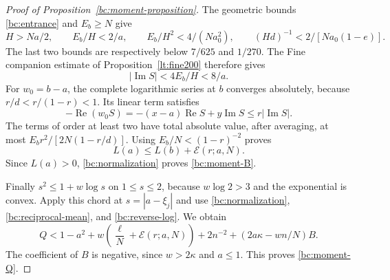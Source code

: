 \documentclass[11pt,reqno]{amsart}
\numberwithin{equation}{section}
\theoremstyle{definition}
\theoremstyle{remark}
\renewcommand{\Re}{\operatorname{Re}}
\renewcommand{\Im}{\operatorname{Im}}
\begin{document}
\begin{proof}[Proof of Proposition~\ref{bc:moment-proposition}]
The geometric bounds \eqref{bc:entrance} and $E_b\geq N$ give
\[
 H>Na/2,\qquad E_b/H<2/a,\qquad
 E_b/H^2<4/(Na_0^2),\qquad (Hd)^{-1}<2/[Na_0(1-e)].
\]
The last two bounds are respectively below $7/625$ and $1/270$.
The Fine companion estimate of Proposition~\ref{lt:fine200} therefore gives
\begin{equation}\label{bc:fine-phase}
 |\Im S|<4E_b/H<8/a.
\end{equation}
For $w_0=b-a$, the complete logarithmic series at $b$ converges
absolutely, because $r/d<r/(1-r)<1$.  Its linear term satisfies
\[
 -\Re(w_0S)=-(x-a)\Re S+y\Im S\leq r|\Im S|.
\]
The terms of order at least two have total absolute value, after
averaging, at most
$E_br^2/[2N(1-r/d)]$.  Using $E_b/N<(1-r)^{-2}$ proves
\begin{equation}\label{bc:reverse-log}
 L(a)\leq L(b)+\mathcal E(r;a,N).
\end{equation}
Since $L(a)>0$, \eqref{bc:normalization} proves
\eqref{bc:moment-B}.

Finally $s^2\leq1+w\log s$ on $1\leq s\leq2$, because
$w\log2>3$ and the exponential is convex.  Apply this chord at
$s=|a-\xi_j|$ and use
\eqref{bc:normalization}, \eqref{bc:reciprocal-mean}, and
\eqref{bc:reverse-log}.  We obtain
\[
 Q<1-a^2+w\left(\frac\ell N+\mathcal E(r;a,N)\right)
      +2n^{-2}+(2a\kappa-wn/N)B.
\]
The coefficient of $B$ is negative, since $w>2\kappa$ and $a\leq1$.
This proves \eqref{bc:moment-Q}.
\end{proof}
\end{document}
